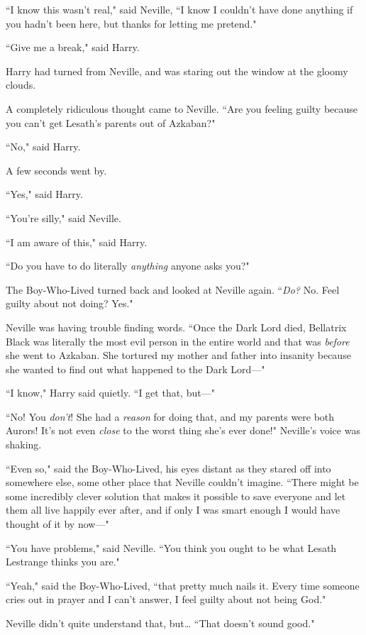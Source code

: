 ``I know this wasn't real," said Neville, ``I know I couldn't have done anything if you hadn't been here, but thanks for letting me pretend."

``Give me a break," said Harry.

Harry had turned from Neville, and was staring out the window at the gloomy clouds.

A completely ridiculous thought came to Neville. ``Are you feeling guilty because you can't get Lesath's parents out of Azkaban?"

``No," said Harry.

A few seconds went by.

``Yes," said Harry.

``You're silly," said Neville.

``I am aware of this," said Harry.

``Do you have to do literally \emph{anything} anyone asks you?"

The Boy-Who-Lived turned back and looked at Neville again. ``\emph{Do?} No. Feel guilty about not doing? Yes."

Neville was having trouble finding words. ``Once the Dark Lord died, Bellatrix Black was literally the most evil person in the entire world and that was \emph{before} she went to Azkaban. She tortured my mother and father into insanity because she wanted to find out what happened to the Dark Lord---"

``I know," Harry said quietly. ``I get that, but---"

``No! You \emph{don't}! She had a \emph{reason} for doing that, and my parents were both Aurors! It's not even \emph{close} to the worst thing she's ever done!" Neville's voice was shaking.

``Even so," said the Boy-Who-Lived, his eyes distant as they stared off into somewhere else, some other place that Neville couldn't imagine. ``There might be some incredibly clever solution that makes it possible to save everyone and let them all live happily ever after, and if only I was smart enough I would have thought of it by now---"

``You have problems," said Neville. ``You think you ought to be what Lesath Lestrange thinks you are."

``Yeah," said the Boy-Who-Lived, ``that pretty much nails it. Every time someone cries out in prayer and I can't answer, I feel guilty about not being God."

Neville didn't quite understand that, but{\ldots} ``That doesn't sound good."

